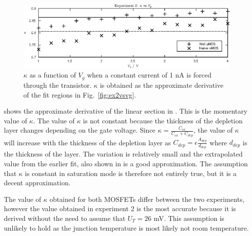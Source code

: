 \begin{figure}
    \center
    \includegraphics{ex2kappavg.eps}
    \caption{\(\kappa\) as a function of \(V_g\) when a constant current of 1 nA is forced through the transistor. \(\kappa\) 
    is obtained as the approximate derivative of the fit regions in Fig.~\ref{fig:ex2vsvg}.}
    \label{fig:ex2kappavg}
\end{figure}
 shows the approximate derivative of the linear section in . This is the momentary value of
\(\kappa\). The value of \(\kappa\) is not constant because the thickness of the depletion layer changes depending on 
the gate voltage. Since \(\kappa = \frac{C_{ox}}{C_{ox}+C_{dep}}\), the value of \(\kappa\) will increase with the thickness of
the depletion layer as \(C_{dep} = \epsilon\frac{A_{dep}}{d_{dep}}\) where \(d_{dep}\) is the thickness of the layer.
The variation is relatively small and the extrapolated value from the earlier fit, also shown in  is a good 
approximation. The assumption that \(\kappa\) is constant in saturation mode is therefore not entirely true, but it is a decent
approximation.

The value of \(\kappa\) obtained for both MOSFETs differ between the two experiments, however the value obtained in experiment 2
is the most accurate because it is derived without the need to assume that \(U_T=26\) mV. This assumption is unlikely to
hold as the junction temperature is most likely not room temperature.

